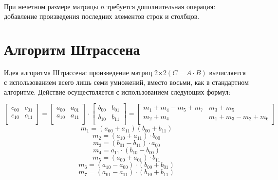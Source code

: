 При нечетном размере матрицы $n$ требуется дополнительная операция: добавление произведения последних элементов строк и столбцов.

\section{Алгоритм Штрассена}

Идея алгоритма Штрассена: произведение матриц 2×2$(C=A\cdot B)$ вычисляется с использованием всего лишь семи умножений, вместо восьми, как в стандартном алгоритме\cite{book_strassen}. Действие осуществляется с использованием следующих формул: 

\begin{equation}
	\label{equ:shtassen}
	\begin{bmatrix}
		c_{00} & c_{01}\\
		c_{10} & c_{11}\\
	\end{bmatrix} = 
	\begin{bmatrix}
		a_{00} & a_{01}\\
		a_{10} & a_{11}\\
	\end{bmatrix} \cdot
	\begin{bmatrix}
		b_{00} & b_{01}\\
		b_{10} & b_{11}\\
	\end{bmatrix} = 
	\begin{bmatrix}
		m_{1} + m_{4} - m_{5} + m_{7} & m_{3} + m_{5}\\
		m_{2} + m_{4} & m_{1} + m_{3} - m_{2} + m_{6}\\
	\end{bmatrix}
\end{equation}
\begin{equation}
	m_{1} = (a_{00} + a_{11})(b_{00} + b_{11})
\end{equation}
\begin{equation}
	m_{2} = (a_{10} + a_{11}) \cdot b_{00}
\end{equation}
\begin{equation}
	m_{3} = (b_{01} - b_{11}) \cdot a_{00}
\end{equation}
\begin{equation}
	m_{4} = a_{11} \cdot (b_{10} - b_{00})
\end{equation}
\begin{equation}
	m_{5} = (a_{00} + a_{01}) \cdot b_{11}
\end{equation}
\begin{equation}
	m_{6} = (a_{10} - a_{00}) \cdot (b_{00} + b_{01})
\end{equation}
\begin{equation}
	m_{7} = (a_{01} - a_{11}) \cdot (b_{10} + b_{11})
\end{equation}

